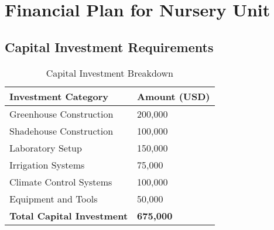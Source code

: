 \section{Financial Plan for Nursery Unit}

\subsection{Capital Investment Requirements}

\begin{table}[h]
\centering
\begin{tabular}{p{}p{}}
\hline
\textbf{Investment Category} & \textbf{Amount (USD)} \\
\hline
Greenhouse Construction & 200,000 \\
Shadehouse Construction & 100,000 \\
Laboratory Setup & 150,000 \\
Irrigation Systems & 75,000 \\
Climate Control Systems & 100,000 \\
Equipment and Tools & 50,000 \\
\hline
\textbf{Total Capital Investment} & \textbf{675,000} \\
\hline
\end{tabular}
\caption{Capital Investment Breakdown}
\end{table}

